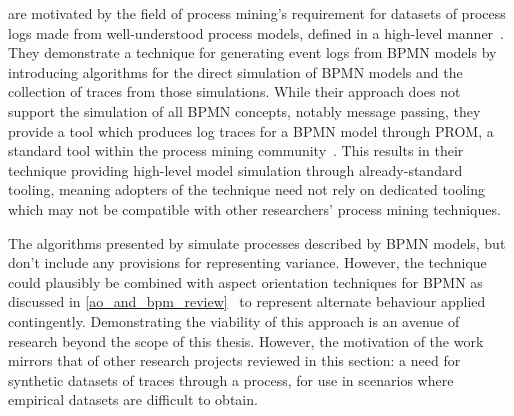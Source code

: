 

\citeauthor{ExecutableBPMNMitsyuk} are motivated by the field of process
mining's requirement for datasets of process logs made from well-understood
process models, defined in a high-level manner~\cite{ExecutableBPMNMitsyuk}.
They demonstrate a technique for generating event logs from BPMN models by
introducing algorithms for the direct simulation of BPMN models and the
collection of traces from those simulations. While their approach does not
support the simulation of all BPMN concepts, notably message passing, they
provide a tool which produces log traces for a BPMN model through PROM, a
standard tool within the process mining community~\cite{van2005prom}. This
results in their technique providing high-level model simulation through
already-standard tooling, meaning adopters of the technique need not rely on
dedicated tooling which may not be compatible with other researchers' process
mining techniques.

The algorithms presented by \citeauthor{ExecutableBPMNMitsyuk} simulate
processes described by BPMN models, but don't include any provisions for
representing variance. However, the technique could plausibly be combined with
aspect orientation techniques for BPMN as discussed in
\cref{ao_and_bpm_review}~\cite{charfi2010AO4BPMN,Cappelli_AOBPM} to represent
alternate behaviour applied contingently. Demonstrating the viability of this
approach is an avenue of research beyond the scope of this thesis. However, the
motivation of the work mirrors that of other research projects reviewed in this
section: a need for synthetic datasets of traces through a process, for use in
scenarios where empirical datasets are difficult to obtain.

